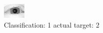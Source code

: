 \begin{figure}[h!]
\begin{center}
\includegraphics[width=0.60\columnwidth]{figures/ID3070_class_1_target_2.png}
\end{center}
\caption{ Classification: 1 actual target: 2}
\label{fig:ID3070_class_1_target_2}
\end{figure}
